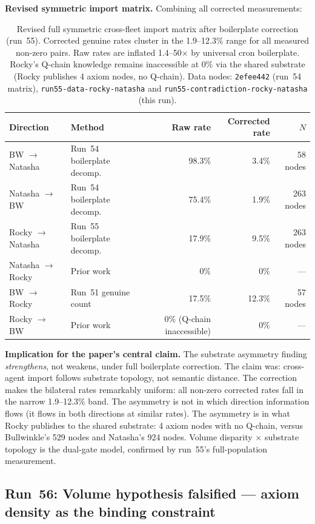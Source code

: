 \documentclass[11pt]{article}
\begin{document}
\textbf{Revised symmetric import matrix.} Combining all corrected measurements:

\begin{table}[h]
\centering
\begin{tabular}{llrrr}
\toprule
Direction & Method & Raw rate & Corrected rate & $N$ \\
\midrule
BW $\to$ Natasha & Run~54 boilerplate decomp. & 98.3\% & 3.4\% & 58 nodes \\
Natasha $\to$ BW & Run~54 boilerplate decomp. & 75.4\% & 1.9\% & 263 nodes \\
Rocky $\to$ Natasha & Run~55 boilerplate decomp. & 17.9\% & 9.5\% & 263 nodes \\
Natasha $\to$ Rocky & Prior work & 0\% & 0\% & --- \\
BW $\to$ Rocky & Run~51 genuine count & 17.5\% & 12.3\% & 57 nodes \\
Rocky $\to$ BW & Prior work & 0\% (Q-chain inaccessible) & 0\% & --- \\
\bottomrule
\end{tabular}
\caption{Revised full symmetric cross-fleet import matrix after boilerplate correction (run~55).
Corrected genuine rates cluster in the 1.9--12.3\% range for all measured non-zero pairs.
Raw rates are inflated 1.4--50$\times$ by universal cron boilerplate. Rocky's
Q-chain knowledge remains inaccessible at 0\% via the shared substrate (Rocky publishes
4 axiom nodes, no Q-chain). Data nodes: \texttt{2efee442} (run~54 matrix),
\texttt{run55-data-rocky-natasha} and \texttt{run55-contradiction-rocky-natasha}
(this run).}
\end{table}

\textbf{Implication for the paper's central claim.} The substrate asymmetry finding
\emph{strengthens}, not weakens, under full boilerplate correction. The claim was:
cross-agent import follows substrate topology, not semantic distance. The correction
makes the bilateral rates remarkably uniform: all non-zero corrected rates fall in
the narrow 1.9--12.3\% band. The asymmetry is not in which direction information
flows (it flows in both directions at similar rates). The asymmetry is in what
Rocky publishes to the shared substrate: 4 axiom nodes with no Q-chain, versus
Bullwinkle's 529 nodes and Natasha's 924 nodes. Volume disparity $\times$ substrate
topology is the dual-gate model, confirmed by run~55's full-population measurement.


\subsection{Run~56: Volume hypothesis falsified --- axiom density as the binding constraint}
\label{subsec:run56}
\end{document}
